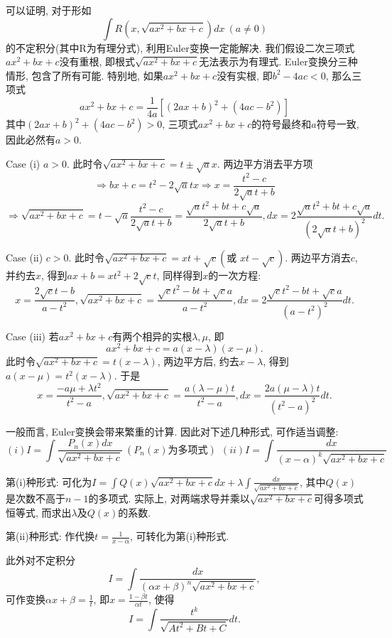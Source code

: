 \documentclass[UTF8,11pt, a4paper, oneside, fontset=none]{ctexbook}
\begin{document}
\begin{tcolorbox}[title=欧拉变换, colback=white, breakable]

可以证明, 对于形如
\[
\int R(x, \sqrt{ax^2 + bx + c}) dx \ (a \neq 0)
\]
的不定积分(其中R为有理分式), 利用Euler变换一定能解决. 我们假设二次三项式$ax^2 + bx + c$没有重根, 即根式$\sqrt{ax^2 + bx + c}$无法表示为有理式. Euler变换分三种情形, 包含了所有可能. 特别地, 如果$ax^2 + bx + c$没有实根, 即$b^2 - 4ac < 0$, 那么三项式
\[
ax^2 + bx + c = \frac{1}{4a} [ (2ax + b)^2 + (4ac - b^2) ]
\]
其中$(2ax + b)^2 + (4ac - b^2) > 0$, 三项式$ax^2 + bx + c$的符号最终和$a$符号一致, 因此必然有$a>0$.


\noindent
Case (i) $a>0$. 此时令$\sqrt{ax^2 + bx + c} = t \pm \sqrt a x $. 两边平方消去平方项
\[
\Rightarrow bx + c = t^2 - 2 \sqrt a t x \Rightarrow x = \frac{t^2 -c}{2 \sqrt a t +b}
\]
\[
\Rightarrow \sqrt{ax^2 + bx + c} = t - \sqrt a \frac{t^2 - c}{2 \sqrt a t + b} = \frac{\sqrt a t^2 + b t + c \sqrt a}{2 \sqrt a t + b}, dx = 2 \frac{\sqrt a t^2 + bt + c \sqrt a}{(2 \sqrt a t + b)^2}dt.
\]


\noindent
Case (ii) $c >0$. 此时令$\sqrt{ax^2 + bx + c} = xt + \sqrt c (\mbox{或 } xt - \sqrt c)$. 两边平方消去$c$, 并约去$x$, 得到$ax + b = xt^2 + 2 \sqrt c t$, 同样得到$x$的一次方程:
\[
x = \frac{2 \sqrt c t - b}{a - t^2}, \sqrt{ax^2 + bx + c} = \frac{\sqrt c t^2 - bt + \sqrt c a}{a-t^2}, dx = 2 \frac{\sqrt c t^2 - bt + \sqrt c a}{(a-t^2)^2}dt.
\]


\noindent
Case (iii) 若$ax^2 + bx +c$有两个相异的实根$\lambda, \mu$, 即
\[
ax^2 + bx + c = a(x - \lambda) (x - \mu).
\]
此时令$\sqrt{ax^2 + bx + c} = t(x - \lambda)$, 两边平方后, 约去$x - \lambda$, 得到$a(x - \mu) = t^2 (x - \lambda)$. 于是
\[
x = \frac{-a\mu + \lambda t^2}{t^2 - a}, \sqrt{ax^2 + bx + c} = \frac{a(\lambda - \mu)t}{t^2 - a}, dx = \frac{2a (\mu - \lambda)t}{(t^2 - a)^2}dt.
\]

一般而言, Euler变换会带来繁重的计算. 因此对下述几种形式, 可作适当调整:
\[
(i) I = \int \frac{P_n(x) dx}{\sqrt{ax^2 + bx + c}} \ (P_n(x) \mbox{为多项式}) \ \ (ii) I = \int \frac{dx}{(x - \alpha)^k \sqrt{ax^2 + bx + c}}
\]


第(i)种形式: 可化为$I = \int Q(x) \sqrt{ax^2 + bx + c} dx + \lambda \int \frac{dx}{\sqrt{ax^2 + bx + c}}$, 其中$Q(x)$是次数不高于$n-1$的多项式. 实际上, 对两端求导并乘以$\sqrt{ax^2 + bx + c}$可得多项式恒等式, 而求出$\lambda$及$Q(x)$的系数.


第(ii)种形式: 作代换$t = \frac{1}{x - \alpha}$, 可转化为第(i)种形式.


此外对不定积分
\[
I = \int \frac{dx}{(\alpha x + \beta)^n \sqrt{ax^2 + bx + c}},
\]
可作变换$\alpha x + \beta = \frac{1}{t}$, 即$x = \frac{1 - \beta t}{\alpha t}$, 使得
\[
I = \int \frac{t^k}{\sqrt{At^2 + Bt + C}}dt.
\]


\end{tcolorbox}
\end{document}
